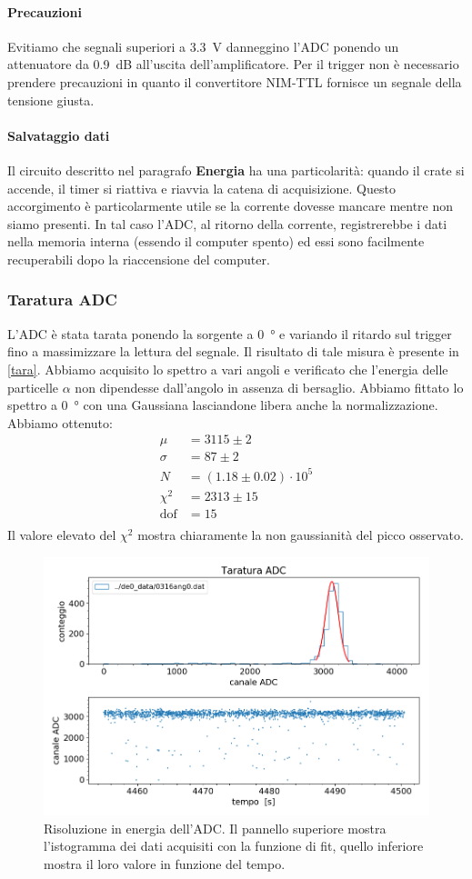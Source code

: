 \paragraph{Precauzioni}
Evitiamo che segnali superiori a \SI{3.3}{V} danneggino l'ADC ponendo un attenuatore da \SI{0.9}{dB} all'uscita dell'amplificatore. Per il trigger non è necessario prendere precauzioni in quanto il convertitore NIM-TTL fornisce un segnale della tensione giusta.

\paragraph{Salvataggio dati}
Il circuito descritto nel paragrafo \textbf{Energia} ha una particolarità: quando il crate si accende, il timer si riattiva e riavvia la catena di acquisizione.
Questo accorgimento è particolarmente utile se la corrente dovesse mancare mentre non siamo presenti. In tal caso l'ADC, al ritorno della corrente, registrerebbe i dati nella memoria interna (essendo il computer spento) ed essi sono facilmente recuperabili dopo la riaccensione del computer.


\subsubsection{Taratura ADC}
L'ADC è stata tarata ponendo la sorgente a \SI{0}{\degree} e variando il ritardo sul trigger fino a massimizzare la lettura del segnale. Il risultato di tale misura è presente in \autoref{tara}. Abbiamo acquisito lo spettro a vari angoli e verificato che l'energia delle particelle $\alpha$ non dipendesse dall'angolo in assenza di bersaglio. 
Abbiamo fittato lo spettro a \SI{0}{\degree} con una Gaussiana lasciandone libera anche la normalizzazione.\\
Abbiamo ottenuto:
\begin{align*}
\mu &=3115\pm2 \\
\sigma &= 87\pm2 \\
N &=(1.18\pm0.02)\cdot10^5 \\
\chi^2 &=2313\pm15 \\
\text{dof} &=15 \\
\end{align*}
Il valore elevato del $\chi^2$ mostra chiaramente la non gaussianità del picco osservato.

\begin{figure}[h]
\centering
\includegraphics[width=23 em]{immagini/cal_provv}
\caption{Risoluzione in energia dell'ADC. Il pannello superiore mostra l'istogramma dei dati acquisiti con la funzione di fit, quello inferiore mostra il loro valore in funzione del tempo.}
\label{tara}
\end{figure}